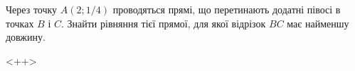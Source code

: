 \documentclass[../rgr1.tex]{subfiles}
\begin{document}
	Через точку $A (2; 1/4)$ проводяться прямі, що перетинають
	додатні півосі в точках $B$ і $C$. Знайти рівняння тієї
	прямої, для якої відрізок $BC$ має найменшу довжину.

\Solution

<++>

\Answer{<++>}
\end{document}
